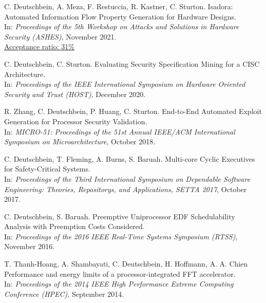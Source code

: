 \documentclass[10pt]{article}
\begin{document}
\begin{bibenum}
	\item C. Deutschbein, A. Meza, F. Restuccia, R. Kastner, C. Sturton.
		Isadora: Automated Information Flow Property Generation for Hardware Designs.\\
		In: \emph{Proceedings of the 5th Workshop on Attacks and Solutions in Hardware Security (ASHES)},
		November 2021. \\
		\href{https://dl.acm.org/doi/pdf/10.1145/3576915.3624028}{Acceptance ratio: 31\%} \\

    \item C. Deutschbein, C. Sturton.
        Evaluating Security Specification Mining for a CISC Architecture.\\
        In: \emph{Proceedings of the IEEE International Symposium on Hardware Oriented Security and Trust (HOST)},
            December 2020. \\

    \item R. Zhang, C. Deutschbein, P. Huang, C. Sturton.
        End-to-End Automated Exploit Generation for Processor Security Validation.\\
        In: \emph{MICRO-51: Proceedings of the 51st Annual IEEE/ACM International Symposium on Microarchitecture},
            October 2018. \\
            
    \item C. Deutschbein, T. Fleming, A. Burns, S. Baruah.
        Multi-core Cyclic Executives for Safety-Critical Systems.\\
        In: \emph{Proceedings of the Third International Symposium on Dependable Software Engineering: Theories, Repositorys, and Applications, SETTA 2017},
            October 2017. \\

    \item C. Deutschbein, S. Baruah.
        Preemptive Uniprocessor EDF Schedulability Analysis with Preemption Costs Considered.\\
        In: \emph{Proceedings of the 2016 IEEE Real-Time Systems Symposium (RTSS)},
            November 2016. \\

    \item T. Thanh-Hoang, A. Shambayati, C. Deutschbein, H. Hoffmann, A. A. Chien
        Performance and energy limits of a processor-integrated FFT accelerator.\\
        In: \emph{Proceedings of the 2014 IEEE High Performance Extreme Computing Conference (HPEC)},
            September 2014. \\

\end{bibenum}
\end{document}
